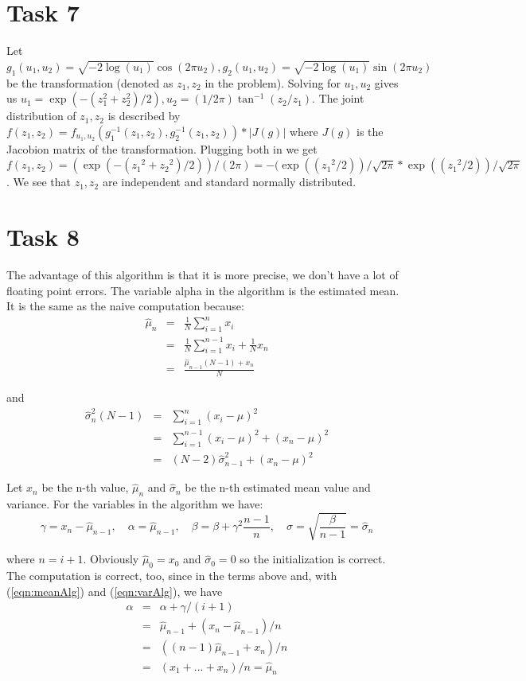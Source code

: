 \documentclass[]{article}
\begin{document}
\section*{Task 7} Let $g_1(u_1,u_2)=\sqrt{-2\log(u_1)}\cos(2\pi
u_2),g_2(u_1,u_2)=\sqrt{-2\log(u_1)}\sin(2\pi u_2)$ be the transformation
(denoted as $z_1, z_2$ in the problem). Solving for $u_1,u_2$ gives us $u_1 =
\exp({-(z_1 ^2+ z_2 ^2)/2}),u_2 = (1/2\pi)\tan^{-1} (z_2/z_1)$. The joint
distribution of $z_1, z_2$ is described by $ f(z_1 ,z_2) = f_{u_1,
u_2}(g_1^{-1}(z_1,z_2),g_2^{-1}(z_1,z_2)) * | J(g) |$ where $J(g)$ is the
Jacobion matrix of the transformation. Plugging both in we get
$f(z_1,z_2)=(\exp(-({z_1}^2+{z_2}^2)/2))/(2\pi)=-(\exp(({z_1}^2/2))/\sqrt{2\pi}*\exp(({z_1}^2/2))/\sqrt{2\pi}$.
We see that $z_1,z_2$ are independent and standard normally distributed.

\section*{Task 8} The advantage of this algorithm is that it is more precise, we
don't have a lot of floating point errors. The variable alpha in the algorithm
is the estimated mean. It is the same as the naive computation because: 
\begin{eqnarray}
    \hat{\mu}_n &= &\frac{1}{N}\sum_{i=1}^n x_i\nonumber\\
    &=&\frac{1}{N}\sum_{i=1}^{n-1}x_i+\frac{1}{N}x_n\nonumber\\
    &=&\frac{\hat{\mu}_{n-1}\left(N-1\right)+x_n}{N}\label{eqn:meanAlg}
\end{eqnarray}

and
\begin{eqnarray}
    \hat{\sigma}^{2}_n\left(N-1\right) &= &\sum_{i=1}^n
    \left(x_i-\mu\right)^2\nonumber\\
    &=&\sum_{i=1}^{n-1}\left(x_i-\mu\right)^2
    +\left(x_n-\mu\right)^2\nonumber\\
    &=&\left(N-2\right)\hat{\sigma}^{2}_{n-1} +
    \left(x_n-\mu\right)^2\label{eqn:varAlg}
\end{eqnarray}

Let $x_n$ be the n-th value, $\hat{\mu}_n$ and $\hat{\sigma}_n$ be the n-th
estimated mean value and variance.  For the variables in the
algorithm we have:
\[\gamma=x_n-\hat{\mu}_{n-1},\quad \alpha=\hat{\mu}_{n-1},\quad \beta = \beta +
\gamma^2\frac{n-1}{n},\quad \sigma = \sqrt{\frac{\beta}{n-1}} =
\hat{\sigma}_{n}\]

where $n=i+1$. Obviously $\hat{\mu}_0=x_0$ and $\hat{\sigma}_0 = 0$ so the initialization is
correct. The computation is correct, too, since in the terms above and, with
(\ref{eqn:meanAlg}) and (\ref{eqn:varAlg}), we have
\begin{eqnarray*}
      \alpha & = &\alpha+\gamma/(i+1) \\
      & = &\hat{\mu}_{n-1}+(x_n-\hat{\mu}_{n-1})/n \\
      & = &((n-1)\hat{\mu}_{n-1}+x_n)/n \\
      & = &(x_1+...+x_n)/n = \hat{\mu}_{n}
\end{eqnarray*} 
\end{document}

